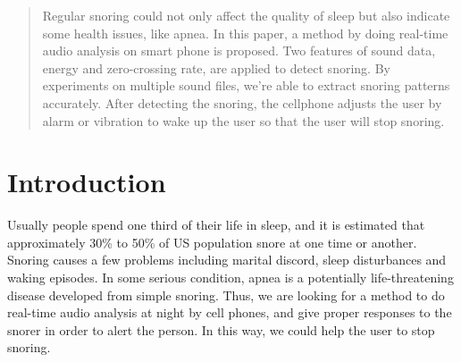 \documentclass[conference]{IEEEtran}
\begin{document}
\begin{abstract}
Regular snoring could not only affect the quality of sleep but also indicate some health issues, like apnea. In this paper, a method by doing real-time audio analysis on smart phone is proposed. Two features of sound data, energy and zero-crossing rate, are applied to detect snoring. By experiments on multiple sound files, we’re able to extract snoring patterns accurately. After detecting the snoring, the cellphone adjusts the user by alarm or vibration to wake up the user so that the user will stop snoring.

\end{abstract}





%
\IEEEpeerreviewmaketitle

\section{Introduction}

Usually people spend one third of their life in sleep, and it is estimated that approximately 30\% to 50\% of US population snore at one time or another. Snoring causes a few problems including marital discord, sleep disturbances and waking episodes\cite{aaoms:2013}. In some serious condition, apnea is a potentially life-threatening disease developed from simple snoring. Thus, we are looking for a method to do real-time audio analysis at night by cell phones, and give proper responses to the snorer in order to alert the person. In this way, we could help the user to stop snoring.  \\
\end{document}
